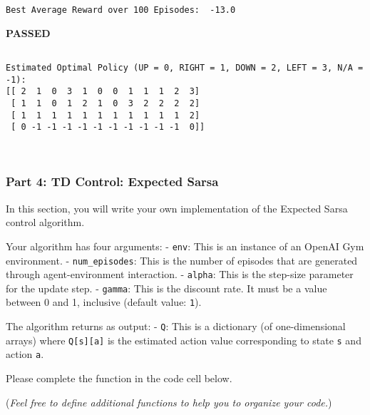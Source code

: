 \documentclass[11pt]{article}
\begin{document}
    \begin{Verbatim}[commandchars=\\\{\}]
Best Average Reward over 100 Episodes:  -13.0

    \end{Verbatim}

    \textbf{{PASSED}}

    
    \begin{Verbatim}[commandchars=\\\{\}]

Estimated Optimal Policy (UP = 0, RIGHT = 1, DOWN = 2, LEFT = 3, N/A = -1):
[[ 2  1  0  3  1  0  0  1  1  1  2  3]
 [ 1  1  0  1  2  1  0  3  2  2  2  2]
 [ 1  1  1  1  1  1  1  1  1  1  1  2]
 [ 0 -1 -1 -1 -1 -1 -1 -1 -1 -1 -1  0]]

    \end{Verbatim}

    \begin{center}
    \end{center}
    { \hspace*{\fill} \\}
    
    \hypertarget{part-4-td-control-expected-sarsa}{%
\subsubsection{Part 4: TD Control: Expected
Sarsa}\label{part-4-td-control-expected-sarsa}}

In this section, you will write your own implementation of the Expected
Sarsa control algorithm.

Your algorithm has four arguments: - \texttt{env}: This is an instance
of an OpenAI Gym environment. - \texttt{num\_episodes}: This is the
number of episodes that are generated through agent-environment
interaction. - \texttt{alpha}: This is the step-size parameter for the
update step. - \texttt{gamma}: This is the discount rate. It must be a
value between 0 and 1, inclusive (default value: \texttt{1}).

The algorithm returns as output: - \texttt{Q}: This is a dictionary (of
one-dimensional arrays) where \texttt{Q{[}s{]}{[}a{]}} is the estimated
action value corresponding to state \texttt{s} and action \texttt{a}.

Please complete the function in the code cell below.

(\emph{Feel free to define additional functions to help you to organize
your code.})
\end{document}
